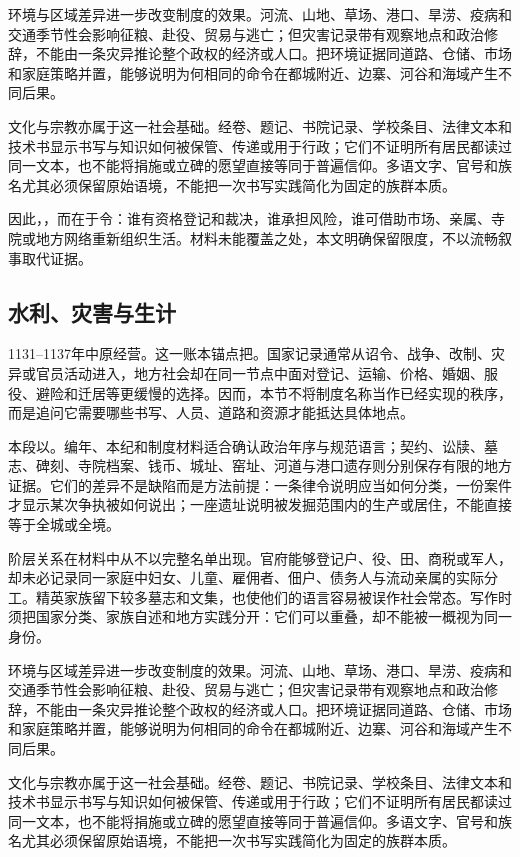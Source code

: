 环境与区域差异进一步改变制度的效果。河流、山地、草场、港口、旱涝、疫病和交通季节性会影响征粮、赴役、贸易与逃亡；但灾害记录带有观察地点和政治修辞，不能由一条灾异推论整个政权的经济或人口。把环境证据同道路、仓储、市场和家庭策略并置，能够说明为何相同的命令在都城附近、边寨、河谷和海域产生不同后果。

文化与宗教亦属于这一社会基础。经卷、题记、书院记录、学校条目、法律文本和技术书显示书写与知识如何被保管、传递或用于行政；它们不证明所有居民都读过同一文本，也不能将捐施或立碑的愿望直接等同于普遍信仰。多语文字、官号和族名尤其必须保留原始语境，不能把一次书写实践简化为固定的族群本质。

因此，，而在于令：谁有资格登记和裁决，谁承担风险，谁可借助市场、亲属、寺院或地方网络重新组织生活。材料未能覆盖之处，本文明确保留限度，不以流畅叙事取代证据。

\subsection{水利、灾害与生计}

1131--1137年中原经营。这一账本锚点把。国家记录通常从诏令、战争、改制、灾异或官员活动进入，地方社会却在同一节点中面对登记、运输、价格、婚姻、服役、避险和迁居等更缓慢的选择。因而，本节不将制度名称当作已经实现的秩序，而是追问它需要哪些书写、人员、道路和资源才能抵达具体地点。

本段以。编年、本纪和制度材料适合确认政治年序与规范语言；契约、讼牍、墓志、碑刻、寺院档案、钱币、城址、窑址、河道与港口遗存则分别保存有限的地方证据。它们的差异不是缺陷而是方法前提：一条律令说明应当如何分类，一份案件才显示某次争执被如何说出；一座遗址说明被发掘范围内的生产或居住，不能直接等于全城或全境。

阶层关系在材料中从不以完整名单出现。官府能够登记户、役、田、商税或军人，却未必记录同一家庭中妇女、儿童、雇佣者、佃户、债务人与流动亲属的实际分工。精英家族留下较多墓志和文集，也使他们的语言容易被误作社会常态。写作时须把国家分类、家族自述和地方实践分开：它们可以重叠，却不能被一概视为同一身份。

环境与区域差异进一步改变制度的效果。河流、山地、草场、港口、旱涝、疫病和交通季节性会影响征粮、赴役、贸易与逃亡；但灾害记录带有观察地点和政治修辞，不能由一条灾异推论整个政权的经济或人口。把环境证据同道路、仓储、市场和家庭策略并置，能够说明为何相同的命令在都城附近、边寨、河谷和海域产生不同后果。

文化与宗教亦属于这一社会基础。经卷、题记、书院记录、学校条目、法律文本和技术书显示书写与知识如何被保管、传递或用于行政；它们不证明所有居民都读过同一文本，也不能将捐施或立碑的愿望直接等同于普遍信仰。多语文字、官号和族名尤其必须保留原始语境，不能把一次书写实践简化为固定的族群本质。

